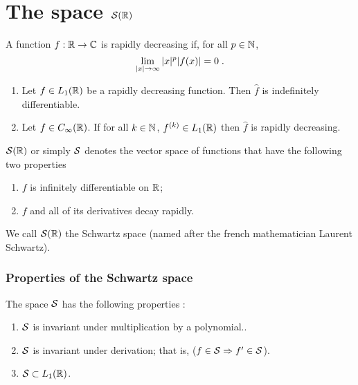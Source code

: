 \section{The space $\mathcal{S}(\mathbb{R})$}
\begin{frame}
\begin{definition}
A function  $f : \mathbb{R} \to \mathbb{C}$ is \alert{rapidly decreasing} if, for all $p \in \mathbb{N}$,
$$
\lim_{|x| \to \infty} |x|^p |f (x)| = 0 \;.
$$
\end{definition}
\begin{theorem}
\label{prop:1913}
\begin{enumerate}[label=(\roman*)]
\item Let  $f \in L_1(\mathbb{R})$ be a rapidly decreasing function. Then $\hat{f}$ is indefinitely differentiable.
\item Let $f \in C_\infty(\mathbb{R})$. If for all $k \in \mathbb{N}$, $f^{(k)} \in L_1(\mathbb{R})$ then $\hat{f}$ is rapidly decreasing.
\end{enumerate}
\end{theorem}
\end{frame}

\begin{frame}
\begin{definition} $\mathcal{S}(\mathbb{R})$ or simply $\mathcal{S}$ denotes the vector space of functions that have the following two properties
\begin{enumerate}[label=(\roman*)]
\item $f$ is infinitely differentiable on $\mathbb{R}$;
\item $f$ and all of its derivatives decay rapidly.
\end{enumerate}
\end{definition}
We call $\mathcal{S}(\mathbb{R})$ the \alert{Schwartz space} (named after the french mathematician Laurent Schwartz).
\end{frame}

\begin{frame}
\frametitle{Properties of the Schwartz space}
\begin{lemma}
The space $\mathcal{S}$ has the following properties :
\begin{enumerate}[label=(\roman*)]
\item $\mathcal{S}$ is invariant under multiplication by a polynomial..
\item $\mathcal{S}$  is invariant under derivation; that is, ($f \in \mathcal{S} \Rightarrow f' \in  \mathcal{S}$).
\item $\mathcal{S} \subset  L_1(\mathbb{R})$.
\end{enumerate}
\end{lemma}
\end{frame}



